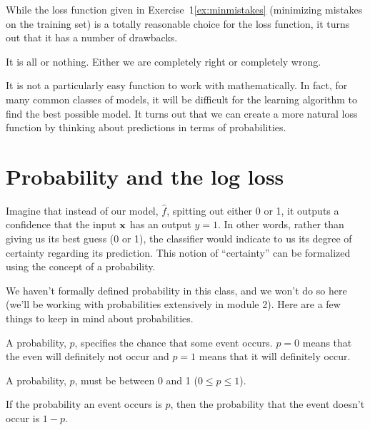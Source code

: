 \documentclass[assignment04_Solutions]{subfiles}
\begin{document}
While the loss function given in Exercise~1\ref{ex:minmistakes} (minimizing mistakes on the training set) is a totally reasonable choice for the loss function, it turns out that it has a number of drawbacks.
\bi
\item It is all or nothing.  Either we are completely right or completely wrong.
\item It is not a particularly easy function to work with mathematically.  In fact, for many common classes of models, it will be difficult for the learning algorithm to find the best possible model.
\ei
It turns out that we can create a more natural loss function by thinking about predictions in terms of probabilities.

\section{Probability and the log loss}
Imagine that instead of our model, $\hat{f}$, spitting out either 0 or 1, it outputs a confidence that the input $\mathbf{x}$ has an output $y= 1$.  In other words, rather than giving us its best guess (0 or 1), the classifier would indicate to us its degree of certainty regarding its prediction.  This notion of ``certainty'' can be formalized using the concept of a probability. %

We haven't formally defined probability in this class, and we won't do so here (we'll be working with probabilities extensively in module 2).  Here are a few things to keep in mind about probabilities.
\bi
\item A probability, $p$, specifies the chance that some event occurs.  $p = 0$ means that the even will definitely not occur and $p=1$ means that it will definitely occur.
\item A probability, $p$, must be between 0 and 1 ($0 \leq p \leq 1$).
\item If the probability an event occurs is $p$, then the probability that the event doesn't occur is $1 - p$.
\ei
\end{document}
